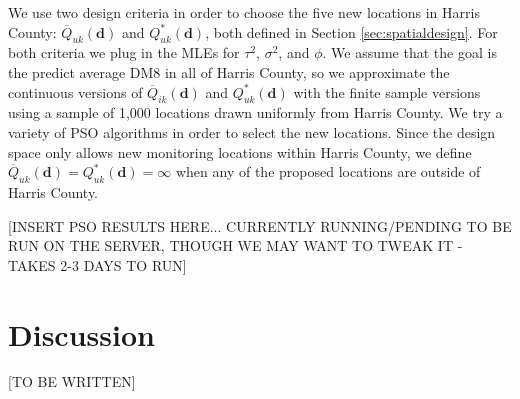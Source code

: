\documentclass[12pt]{article}
\begin{document}
We use two design criteria in order to choose the five new locations in Harris County: $\overline{Q}_{uk}(\bm{d})$ and $Q^*_{uk}(\bm{d})$, both defined in Section \ref{sec:spatialdesign}. For both criteria we plug in the MLEs for $\tau^2$, $\sigma^2$, and $\phi$. We assume that the goal is the predict average DM8 in all of Harris County, so we approximate the continuous versions of $\overline{Q}_{ik}(\bm{d})$ and $Q^*_{uk}(\bm{d})$ with the finite sample versions using a sample of 1,000 locations drawn uniformly from Harris County. We try a variety of PSO algorithms in order to select the new locations. Since the design space only allows new monitoring locations within Harris County, we define $\overline{Q}_{uk}(\bm{d})=Q^*_{uk}(\bm{d})=\infty$ when any of the proposed locations are outside of Harris County.

[INSERT PSO RESULTS HERE... CURRENTLY RUNNING/PENDING TO BE RUN ON THE SERVER, THOUGH WE MAY WANT TO TWEAK IT - TAKES 2-3 DAYS TO RUN]

\section{Discussion}\label{sec:discuss}
[TO BE WRITTEN]

\clearpage\pagebreak\newpage\thispagestyle{empty}


\end{document}
